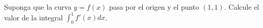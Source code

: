 \item Suponga que la curva $y = f(x)$ pasa por el origen y el punto $(1, 1)$. Calcule el valor de la integral $\int_0^1 f'(x) dx$.
